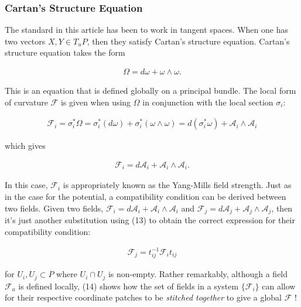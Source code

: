 \documentclass[fleqn, twocolumn, 10pt]{article}
\begin{document}
\subsubsection{Cartan's Structure Equation}
The standard in this article has been to work in tangent spaces. When one has two vectors $X, Y \in T_uP$, then they satisfy Cartan's structure equation. Cartan's structure equation takes the form

\begin{ceqn}
\begin{align*}
\Omega = d\omega + \omega\land\omega.
\end{align*}
\end{ceqn}
This is an equation that is defined globally on a principal bundle. The local form of curvature $\mathcal{F}$ is given when using $\Omega$ in conjunction with the local section $\sigma_i$:

\begin{ceqn}
\begin{align*}
\mathcal{F}_i = \sigma^\ast_i\Omega = \sigma^\ast_i(d\omega) + \sigma^\ast_i(\omega\land\omega) =  d(\sigma^\ast_i\omega) + \mathcal{A}_i\land\mathcal{A}_i
\end{align*}
\end{ceqn}
which gives

\begin{ceqn}
\begin{align*}
\mathcal{F}_i = d\mathcal{A}_i + \mathcal{A}_i\land\mathcal{A}_i.
\end{align*}
\end{ceqn}

In this case, $\mathcal{F}_i$ is appropriately known as the Yang-Mills field strength. Just as in the case for the potential, a compatibility condition can be derived between two fields. Given two fields, $\mathcal{F}_i = d\mathcal{A}_i + \mathcal{A}_i\land\mathcal{A}_i$ and $\mathcal{F}_j = d\mathcal{A}_j + \mathcal{A}_j\land\mathcal{A}_j$, then it's just another substitution using (13) to obtain the correct expression for their compatibility condition:

\begin{ceqn}
\begin{align}\tag{14}
\mathcal{F}_j = t^{-1}_{ij}\mathcal{F}_it_{ij}
\end{align}
\end{ceqn}
for $U_i, U_j \subset P$ where $U_i \cap U_j$ is non-empty. Rather remarkably, although a field $\mathcal{F}_a$ is defined locally, (14) shows how the set of fields in a system $\{\mathcal{F}_i\}$ can allow for their respective coordinate patches to be \textit{stitched together} to give a global $\mathcal{F}$ \cite{nakahara2003geometry, kai2015lam, schuller2014geometric}!
\end{document}

